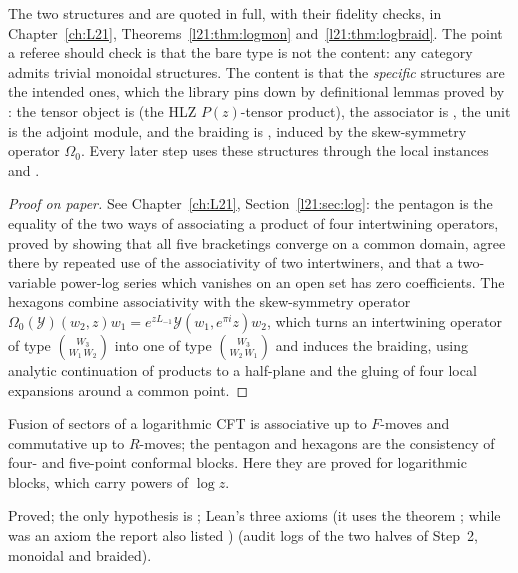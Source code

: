 \begin{dictionary}
The two structures  and  are quoted in full,
with their fidelity checks, in Chapter~\ref{ch:L21}, Theorems~\ref{l21:thm:logmon} and~\ref{l21:thm:logbraid}. The
point a referee should check is that the bare type  is not the content: any
category admits trivial monoidal structures. The content is that the \emph{specific} structures are the intended
ones, which the library pins down by definitional lemmas proved by : the tensor object is
 (the HLZ $P(z)$-tensor product), the associator is , the unit is the
adjoint module, and the braiding is , induced by the skew-symmetry operator $\Omega_0$. Every
later step uses these structures through the local instances  and
.
\end{dictionary}

\begin{proof}[Proof on paper]
See Chapter~\ref{ch:L21}, Section~\ref{l21:sec:log}: the pentagon is the equality of the two ways of associating a
product of four intertwining operators, proved by showing that all five bracketings converge on a common domain,
agree there by repeated use of the associativity of two intertwiners, and that a two-variable power-log series which
vanishes on an open set has zero coefficients. The hexagons combine associativity with the skew-symmetry operator
$\Omega_0(\mathcal Y)(w_2,z)w_1=e^{zL_{-1}}\mathcal Y(w_1,e^{\pi i}z)w_2$, which turns an intertwining operator of type
$\binom{W_3}{W_1\,W_2}$ into one of type $\binom{W_3}{W_2\,W_1}$ and induces the braiding, using analytic continuation of products to a half-plane
and the gluing of four local expansions around a common point.
\end{proof}

\begin{physics}
Fusion of sectors of a logarithmic CFT is associative up to $F$-moves and commutative up to $R$-moves; the pentagon and
hexagons are the consistency of four- and five-point conformal blocks. Here they are proved for logarithmic blocks,
which carry powers of $\log z$.
\end{physics}

\begin{status}
Proved; the only hypothesis is ; Lean's three axioms (it uses the theorem ; while  was an axiom the report also listed ) (audit logs of the two halves of Step~2, monoidal and braided).
\end{status}

